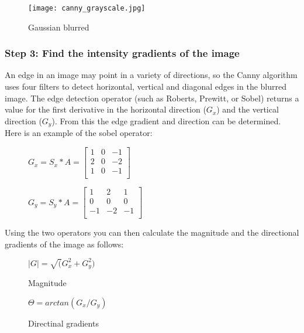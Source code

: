 \begin{figure}[!htb]
    \centering
    \texttt{[image: canny\_grayscale.jpg]}
    \caption{Gaussian blurred}
\end{figure}


\subsubsection{Step 3: Find the intensity gradients of the image}
An edge in an image may point in a variety of directions, so the Canny algorithm uses four filters to detect horizontal, vertical and diagonal edges in the blurred image. The edge detection operator (such as Roberts, Prewitt, or Sobel) returns a value for the first derivative in the horizontal direction ($G_{x}$) and the vertical direction ($G_{y}$). From this the edge gradient and direction can be determined. Here is an example of the sobel operator:

\begin{figure}[!htb]
    \centering
    \begin{minipage}{.5\textwidth}
        \centering
        $G_{x} = S_{x} * A =
        \left[ \begin{array}{rrrr}
        1 & 0 & -1 \\
        2 & 0 & -2 \\
        1 & 0 & -1 \\
        \end{array}\right] $
    \end{minipage}%
    \begin{minipage}{.5\textwidth}
        \centering
        $G_{y} = S_{y} * A =
        \left[ \begin{array}{rrrr}
        1 & 2 & 1 \\
        0 & 0 & 0 \\
        -1 & -2 & -1 \\
        \end{array}\right] $
    \end{minipage}
\end{figure}

\vspace{5mm}
\noindent Using the two operators you can then calculate the magnitude and the directional gradients of the image as follows:

\begin{figure}[!htb]
    \centering
    \begin{minipage}{.5\textwidth}
        \centering
        $|G| = \sqrt(G^{2}_{x} + G^{2}_{y})$
        \caption{Magnitude}
    \end{minipage}%
    \begin{minipage}{.5\textwidth}
        \centering
        $\Theta = arctan(G_{x}/G_{y})$
        \caption{Directinal gradients}
    \end{minipage}
\end{figure}


